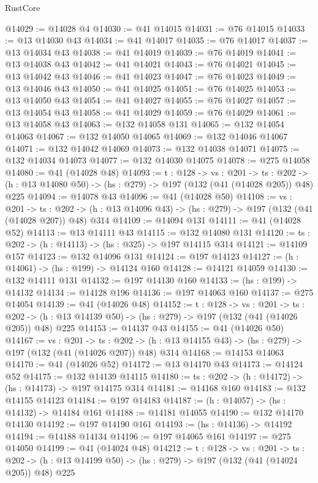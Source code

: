 \begin{lexlean}{RustCore}
\begin{coremodule}
@14029 := @14028 @4
@14030 := @41 @14015
@14031 := @76 @14015
@14033 := @13 @14030 @43
@14034 := @41 @14017
@14035 := @76 @14017
@14037 := @13 @14034 @43
@14038 := @41 @14019
@14039 := @76 @14019
@14041 := @13 @14038 @43
@14042 := @41 @14021
@14043 := @76 @14021
@14045 := @13 @14042 @43
@14046 := @41 @14023
@14047 := @76 @14023
@14049 := @13 @14046 @43
@14050 := @41 @14025
@14051 := @76 @14025
@14053 := @13 @14050 @43
@14054 := @41 @14027
@14055 := @76 @14027
@14057 := @13 @14054 @43
@14058 := @41 @14029
@14059 := @76 @14029
@14061 := @13 @14058 @43
@14063 := @132 @14058 @131
@14065 := @132 @14054 @14063
@14067 := @132 @14050 @14065
@14069 := @132 @14046 @14067
@14071 := @132 @14042 @14069
@14073 := @132 @14038 @14071
@14075 := @132 @14034 @14073
@14077 := @132 @14030 @14075
@14078 := @275 @14058
@14080 := @41 (@14028 @48)
@14093 := {t : @128} ->
  {vs : @201} ->
  {ts : @202} -> (h : @13 @14080 @50) -> (hs : @279) -> @197 (@132 (@41 (@14028 @205)) @48) @225
@14094 := @14078 @43
@14096 := @41 (@14028 @50)
@14108 := {vs : @201} ->
  {ts : @202} -> (h : @13 @14096 @43) -> (hs : @279) -> @197 (@132 (@41 (@14028 @207)) @48) @314
@14109 := @14094 @131
@14111 := @41 (@14028 @52)
@14113 := @13 @14111 @43
@14115 := @132 @14080 @131
@14120 := {ts : @202} -> (h : @14113) -> (hs : @325) -> @197 @14115 @314
@14121 := @14109 @157
@14123 := @132 @14096 @131
@14124 := @197 @14123
@14127 := (h : @14061) -> (hs : @199) -> @14124 @160
@14128 := @14121 @14059
@14130 := @132 @14111 @131
@14132 := @197 @14130 @160
@14133 := (hs : @199) -> @14132
@14134 := @14128 @196
@14136 := @197 @14063 @160
@14137 := @275 @14054
@14139 := @41 (@14026 @48)
@14152 := {t : @128} ->
  {vs : @201} ->
  {ts : @202} -> (h : @13 @14139 @50) -> (hs : @279) -> @197 (@132 (@41 (@14026 @205)) @48) @225
@14153 := @14137 @43
@14155 := @41 (@14026 @50)
@14167 := {vs : @201} ->
  {ts : @202} -> (h : @13 @14155 @43) -> (hs : @279) -> @197 (@132 (@41 (@14026 @207)) @48) @314
@14168 := @14153 @14063
@14170 := @41 (@14026 @52)
@14172 := @13 @14170 @43
@14173 := @14124 @52
@14175 := @132 @14139 @14115
@14180 := {ts : @202} -> (h : @14172) -> (hs : @14173) -> @197 @14175 @314
@14181 := @14168 @160
@14183 := @132 @14155 @14123
@14184 := @197 @14183
@14187 := (h : @14057) -> (hs : @14132) -> @14184 @161
@14188 := @14181 @14055
@14190 := @132 @14170 @14130
@14192 := @197 @14190 @161
@14193 := (hs : @14136) -> @14192
@14194 := @14188 @14134
@14196 := @197 @14065 @161
@14197 := @275 @14050
@14199 := @41 (@14024 @48)
@14212 := {t : @128} ->
  {vs : @201} ->
  {ts : @202} -> (h : @13 @14199 @50) -> (hs : @279) -> @197 (@132 (@41 (@14024 @205)) @48) @225

\end{coremodule}
\end{lexlean}
